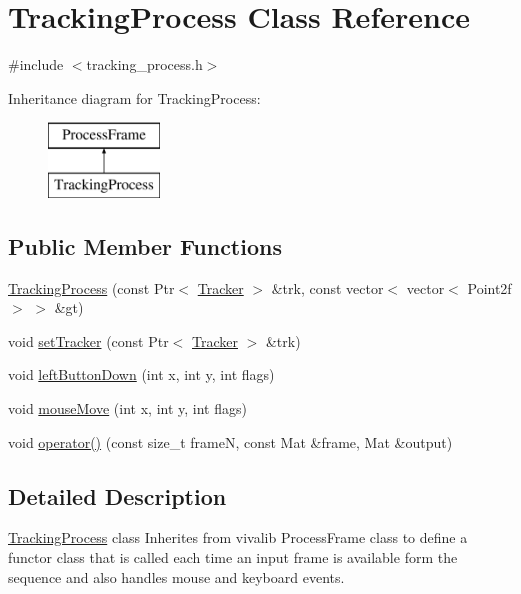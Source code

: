 \hypertarget{class_tracking_process}{}\section{Tracking\+Process Class Reference}
\label{class_tracking_process}


{\ttfamily \#include $<$tracking\+\_\+process.\+h$>$}

Inheritance diagram for Tracking\+Process\+:\begin{figure}[H]
\begin{center}
\leavevmode
\includegraphics[height=2.000000cm]{class_tracking_process}
\end{center}
\end{figure}
\subsection*{Public Member Functions}
\begin{DoxyCompactItemize}
\item 
\hyperlink{class_tracking_process_a155da76d3cde928fb05e15de76c93640}{Tracking\+Process} (const Ptr$<$ \hyperlink{class_tracker}{Tracker} $>$ \&trk, const vector$<$ vector$<$ Point2f $>$ $>$ \&gt)
\item 
void \hyperlink{class_tracking_process_a8e10ca81e6df17389e1bdd7cec852613}{set\+Tracker} (const Ptr$<$ \hyperlink{class_tracker}{Tracker} $>$ \&trk)
\item 
void \hyperlink{class_tracking_process_a648f36431e7c0932b4befec1fdbc7e44}{left\+Button\+Down} (int x, int y, int flags)
\item 
void \hyperlink{class_tracking_process_a4d1f2b19eda65a24a301ab28e3c56fe2}{mouse\+Move} (int x, int y, int flags)
\item 
void \hyperlink{class_tracking_process_aa4622c0d0e0f4968fc67b414d5989b25}{operator()} (const size\+\_\+t frameN, const Mat \&frame, Mat \&output)
\end{DoxyCompactItemize}


\subsection{Detailed Description}
\hyperlink{class_tracking_process}{Tracking\+Process} class Inherites from vivalib Process\+Frame class to define a functor class that is called each time an input frame is available form the sequence and also handles mouse and keyboard events. 

